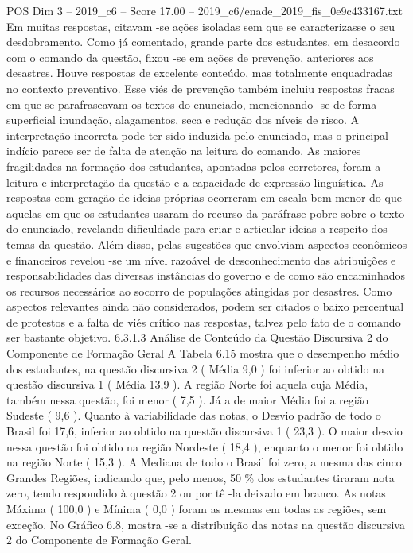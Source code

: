 \begin{textsample}{POS Dim 3 – 2019\_c6 – Score 17.00 – 2019\_c6/enade\_2019\_fis\_0e9c433167.txt}
Em muitas respostas, citavam -se ações isoladas sem que se caracterizasse o seu desdobramento.
Como já comentado, grande parte dos estudantes, em desacordo com o comando da questão, fixou -se em ações de prevenção, anteriores aos desastres.
Houve respostas de excelente conteúdo, mas totalmente enquadradas no contexto preventivo.
Esse viés de prevenção também incluiu respostas fracas em que se parafraseavam os textos do enunciado, mencionando -se de forma superficial inundação, alagamentos, seca e redução dos níveis de risco.
A interpretação incorreta pode ter sido induzida pelo enunciado, mas o principal indício parece ser de falta de atenção na leitura do comando.
As maiores fragilidades na formação dos estudantes, apontadas pelos corretores, foram a leitura e interpretação da questão e a capacidade de expressão linguística.
As respostas com geração de ideias próprias ocorreram em escala bem menor do que aquelas em que os estudantes usaram do recurso da paráfrase pobre sobre o texto do enunciado, revelando dificuldade para criar e articular ideias a respeito dos temas da questão.
Além disso, pelas sugestões que envolviam aspectos econômicos e financeiros revelou -se um nível razoável de desconhecimento das atribuições e responsabilidades das diversas instâncias do governo e de como são encaminhados os recursos necessários ao socorro de populações atingidas por desastres.
Como aspectos relevantes ainda não considerados, podem ser citados o baixo percentual de protestos e a falta de viés crítico nas respostas, talvez pelo fato de o comando ser bastante objetivo. 6.3.1.3 Análise de Conteúdo da Questão Discursiva 2 do Componente de Formação Geral A Tabela 6.15 mostra que o desempenho médio dos estudantes, na questão discursiva 2 ( Média 9,0 ) foi inferior ao obtido na questão discursiva 1 ( Média 13,9 ).
A região Norte foi aquela cuja Média, também nessa questão, foi menor ( 7,5 ).
Já a de maior Média foi a região Sudeste ( 9,6 ).
Quanto à variabilidade das notas, o Desvio padrão de todo o Brasil foi 17,6, inferior ao obtido na questão discursiva 1 ( 23,3 ).
O maior desvio nessa questão foi obtido na região Nordeste ( 18,4 ), enquanto o menor foi obtido na região Norte ( 15,3 ).
A Mediana de todo o Brasil foi zero, a mesma das cinco Grandes Regiões, indicando que, pelo menos, 50 \% dos estudantes tiraram nota zero, tendo respondido à questão 2 ou por tê -la deixado em branco.
As notas Máxima ( 100,0 ) e Mínima ( 0,0 ) foram as mesmas em todas as regiões, sem exceção.
No Gráfico 6.8, mostra -se a distribuição das notas na questão discursiva 2 do Componente de Formação Geral.

\end{textsample}
